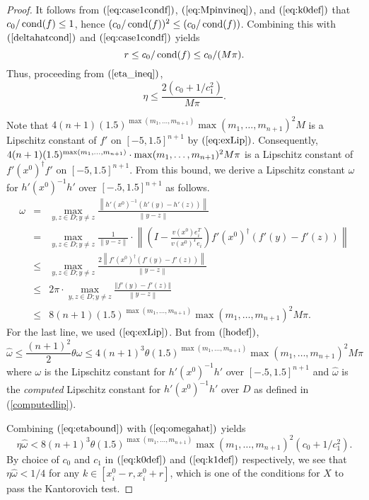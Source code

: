 \documentclass{article}
\newcommand{\cond}[1]{\mathop{\rm{cond}}(#1)}
\newcommand{\norm}[1]{\left\|#1\right\|} \newcommand{\norma}[1]{\left\|#1\right\|}   \newcommand{\inv}[1]{#1^{-1}}
\newcommand{\mpinv}[1]{#1^{\dagger}}  \newcommand\eps{\epsilon}
\newcommand\eref[1]{$(\ref{#1})$}
\begin{document}
\begin{proof}
It follows from \eref{eq:case1condf}, \eref{eq:Mpinvineq}, and
\eref{eq:k0def} that $c_0/\cond{f}\le 1$, hence
$(c_0/\cond{f})^2\le (c_0/\cond{f})$.  Combining this with
\eref{deltahatcond} 
and \eref{eq:case1condf}
yields
\begin{equation}
r\le c_0/\cond{f}\le c_0/(M\pi).
\label{eq:rbdcase1}
\end{equation}
Thus, proceeding from \eref{eta_ineq},
\begin{equation}
\eta\le \frac{2(c_0+1/c_1^2)}{M\pi}.
\label{eq:etabound}
\end{equation}


Note that $4(n+1)(1.5)^{\max(m_1,\ldots,m_{n+1})}\max(m_1,\ldots,m_{n+1})^2M$ is a Lipschitz
constant of $f'$ on $[-5,1.5]^{n+1}$ by \eref{eq:exLip}.  Consequently, $4(n+1)(1.5)^{\max(m_1,\ldots,m_{n+1})}\cdot\linebreak\max(m_1,\ldots,m_{n+1})^2M\pi$ is a Lipschitz
constant of  $\mpinv{f'(x^0)}f'$ on $[-5,1.5]^{n+1}$. From this bound,
we derive a Lipschitz constant
$\omega$ for
 $h'(x^0)^{-1}h'$ over $[-.5,1.5]^{n+1}$ as follows.
\begin{eqnarray}
\omega & = & \max_{y,z\in D;y\ne z}
\frac{\norm{h'(x^0)^{-1}\left(h'(y)-h'(z)
\right)} }{ \norm{y-z} } \nonumber \\
& = & \max_{y,z\in D;y\ne z}\frac{1}{\norm{y-z}} \cdot
\norm{\left(I-\frac{v(x^0)e_i^T}{v(x^0)^T
e_i}\right)\mpinv{f'(x^0)}\left(f'(y)-f'(z)\right) } \nonumber \\
& \leq &\max_{y,z\in D;y\ne z} \frac{2\norm{\mpinv{f'(x^0)}\left(f'(y)-f'(z)\right)
}}{\norm{y-z}} \nonumber
\\
& \leq &2\pi\cdot \max_{y,z\in D;y\ne z} \frac{\Vert f'(y)-f'(z)\Vert}
{\norm{y-z}} \nonumber
\\
& \leq &
8(n+1)(1.5)^{\max(m_1,\ldots,m_{n+1})}\max(m_1,\ldots,m_{n+1})^2M\pi. \nonumber
\end{eqnarray}
For the last line, we used
\eref{eq:exLip}.
But from \eref{hodef},
\begin{equation}
\hat \omega \leq \frac{(n+1)^2}{2} \theta \omega 
\leq 4(n+1)^3\theta(1.5)^{\max(m_1,\ldots,m_{n+1})}\max(m_1,\ldots,m_{n+1})^2M\pi
\label{eq:omegahat}
\end{equation}
where $\omega$ is the Lipschitz constant for $h'(x^0)^{-1}h'$ over
$[-.5,1.5]^{n+1}$
and $\hat \omega$ is the \emph{computed} Lipschitz constant for
$h'(x^0)^{-1}h'$ over $D$ as defined in (\ref{computedlip}).

Combining \eref{eq:etabound} with
\eref{eq:omegahat} yields
\begin{equation}
\label{pass_first} \eta \hat \omega < 8(n+1)^3\theta(1.5)^{\max(m_1,\ldots,m_{n+1})}
\max(m_1,\ldots,m_{n+1})^2(c_0+1/c_1^2).
\end{equation}
By choice of $c_0$ and $c_1$ in \eref{eq:k0def} and \eref{eq:k1def}
respectively, we see that $\eta\hat\omega <1/4$
for any $k \in [x^0_i-r,x^0_i+r]$, which is one of the conditions
for $X$ to pass the Kantorovich test.


\end{proof}
\end{document}
